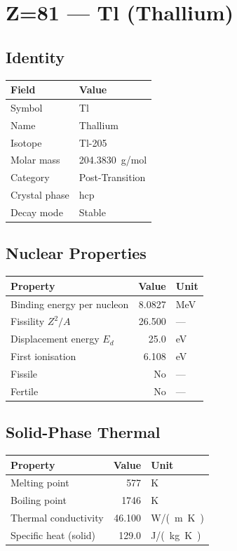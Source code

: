 \documentclass[11pt,a4paper]{article}
\begin{document}
\newpage

\section{Z=81 --- Tl (Thallium)}
\label{sec:Z81}

\subsection{Identity}
\begin{tabular}{ll}
  \toprule
  Field & Value \\
  \midrule
  Symbol & Tl \\
  Name & Thallium \\
  Isotope & Tl-205 \\
  Molar mass & \SI{204.3830}{g/mol} \\
  Category & Post-Transition \\
  Crystal phase & hcp \\
  Decay mode & Stable \\
  \bottomrule
\end{tabular}

\subsection{Nuclear Properties}
\begin{tabular}{lrl}
  \toprule
  Property & Value & Unit \\
  \midrule
  Binding energy per nucleon & 8.0827 & \si{MeV} \\
  Fissility $Z^2/A$ & 26.500 & --- \\
  Displacement energy $E_d$ & 25.0 & \si{eV} \\
  First ionisation & 6.108 & \si{eV} \\
  Fissile & No & --- \\
  Fertile & No & --- \\
  \bottomrule
\end{tabular}

\subsection{Solid-Phase Thermal}
\begin{tabular}{lrl}
  \toprule
  Property & Value & Unit \\
  \midrule
  Melting point & 577 & \si{K} \\
  Boiling point & 1746 & \si{K} \\
  Thermal conductivity & 46.100 & \si{W/(m.K)} \\
  Specific heat (solid) & 129.0 & \si{J/(kg.K)} \\
  \bottomrule
\end{tabular}
\end{document}
